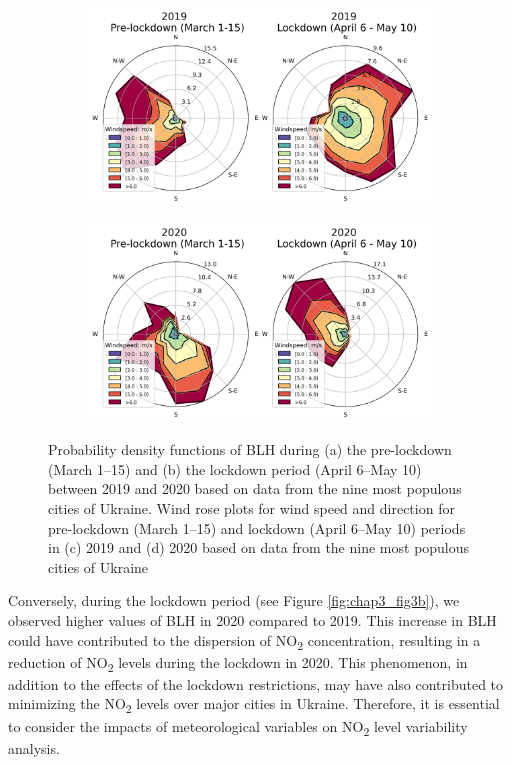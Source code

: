 \begin{figure}[tbh!]
\begin{subfigure}{.5\textwidth}
        \centering
        \includegraphics[width=\textwidth]{figs/chap3/fig4_a_2019.png}
        \caption{}
        \label{fig:chap3_fig4a}
    \end{subfigure}%
    \begin{subfigure}{.5\textwidth}
        \centering
        \includegraphics[width=\textwidth]{figs/chap3/fig4_b_2020.png}
        \caption{}
        \label{fig:chap3_fig4b}
    \end{subfigure}
    \caption[Meteorological variations during pre-lockdown and lockdown]{Probability density functions of BLH during (a) the pre-lockdown (March 1–15) and (b) the lockdown period (April 6–May 10) between 2019 and 2020 based on data from the nine most populous cities of Ukraine. Wind rose plots for wind speed and direction for pre-lockdown (March 1–15) and lockdown (April 6–May 10) periods in (c) 2019 and (d) 2020 based on data from the nine most populous cities of Ukraine}
    \label{fig:chap3_fig34}
\end{figure}

Conversely, during the lockdown period (see Figure \ref{fig:chap3_fig3b}), we observed higher values of BLH in 2020 compared to 2019. This increase in BLH could have contributed to the dispersion of NO\textsubscript{2} concentration, resulting in a reduction of NO\textsubscript{2} levels during the lockdown in 2020. This phenomenon, in addition to the effects of the lockdown restrictions, may have also contributed to minimizing the NO\textsubscript{2} levels over major cities in Ukraine. Therefore, it is essential to consider the impacts of meteorological variables on NO\textsubscript{2} level variability analysis.\par


